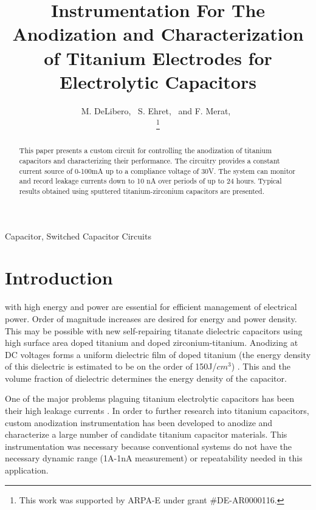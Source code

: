\documentclass[journal]{IEEEtran}
\begin{document}
\title{Instrumentation For The Anodization and Characterization of Titanium Electrodes for Electrolytic Capacitors}

\author{M. DeLibero,~
        S. Ehret,~
        and F. Merat,~%

\thanks{This work was supported by ARPA-E under grant \#DE-AR0000116.}}

\maketitle

\begin{abstract}
This paper presents a custom circuit for controlling the anodization of titanium capacitors and characterizing their performance. The circuitry provides a constant current source of 0-100mA up to a compliance voltage of 30V. The system can monitor and record leakage currents down to 10 nA over periods of up to 24 hours. Typical results obtained using sputtered titanium-zirconium capacitors are presented.
\end{abstract}

\begin{IEEEkeywords}
Capacitor, Switched Capacitor Circuits
\end{IEEEkeywords}

\IEEEpeerreviewmaketitle

\section{Introduction}

 with high energy and power are essential for efficient management of electrical power.  Order of magnitude increases are desired for energy and power density. This may be possible with new self-repairing titanate dielectric capacitors using high surface area doped titanium and doped zirconium-titanium.  Anodizing at DC voltages forms a uniform dielectric film of doped titanium (the energy density of this dielectric is estimated to be on the order of 150J/$cm^3$) \cite{tiSponge}. This and the volume fraction of dielectric determines the energy density of the capacitor.

One of the major problems plaguing titanium electrolytic capacitors has been their high leakage currents \cite{tiCharHag}. In order to further research into titanium capacitors, custom anodization instrumentation has been developed to anodize and characterize a large number of candidate titanium capacitor materials. This instrumentation was necessary because conventional systems do not have the necessary dynamic range (1A-1nA measurement) or repeatability needed in this application.
\end{document}
